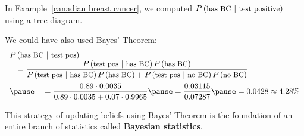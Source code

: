 \documentclass{beamer}
\newcommand{\prob}[1]{P\left({#1}\right)}
\newcommand{\condprob}[2]{\prob{{#1}~|~{#2}}}
\begin{document}
\newcommand{\testpositive}{\text{\small test pos}}
\newcommand{\hasBC}{\text{\small has BC}}
\newcommand{\noBC}{\text{\small no BC}}
\begin{frame}
\begin{example}
In Example~\ref{canadian breast cancer}, we computed $\condprob{\text{\small has BC}}{\text{\small test positive}}$ using a tree diagram.\pause

\vspace{2mm}
We could have also used Bayes' Theorem:
\begin{equation*}
\begin{array}{l}
\condprob{\hasBC}{\testpositive}\\
\quad= \dfrac{\bayesterm{\testpositive}{\hasBC}}{\bayesterm{\testpositive}{\hasBC}+\bayesterm{\testpositive}{\noBC}} \\[4mm]\pause
\quad= \dfrac{0.89\cdot 0.0035}{0.89\cdot0.0035 + 0.07\cdot 0.9965} \pause = \dfrac{0.03115}{0.07287} \pause = 0.0428 \approx 4.28\%
\end{array}
\end{equation*}
\end{example}\pause

\begin{note}
This strategy of updating beliefs using Bayes' Theorem is the foundation of an entire branch of statistics called \textbf{Bayesian statistics}.
\end{note}
\end{frame}
\end{document}
